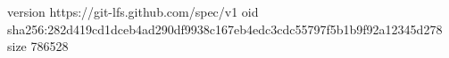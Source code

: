 version https://git-lfs.github.com/spec/v1
oid sha256:282d419cd1dceb4ad290df9938c167eb4edc3cdc55797f5b1b9f92a12345d278
size 786528
